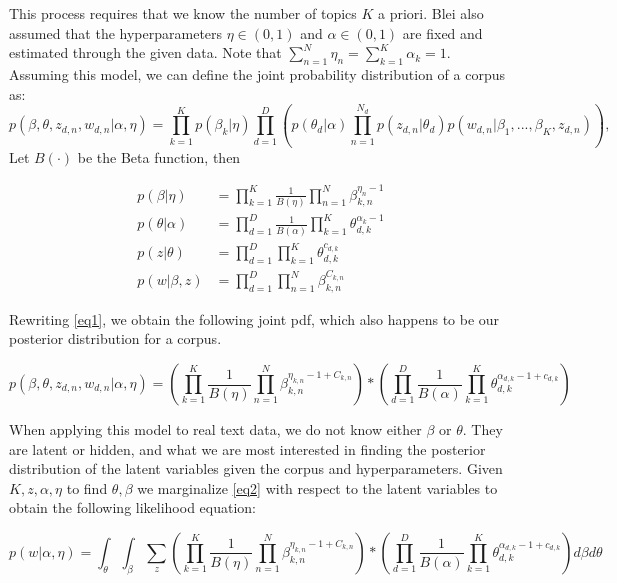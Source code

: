 \documentclass[3p,times]{elsarticle}
\begin{document}
This process requires that we know the number of topics $K$ a priori. Blei also assumed that the hyperparameters $\eta \in  (0,1)$ and $\alpha \in (0,1)$ are fixed and estimated through the given data. Note that $\sum_{n=1}^{N}{\eta_{n}}=\sum_{k=1}^{K}{\alpha_{k}}=1$. Assuming this model, we can define the joint probability distribution of a corpus as:
\begin{equation} \label{eq1}
p(\beta,\theta,z_{d,n},w_{d,n} | \alpha,\eta) = \prod_{k=1}^{K}{p(\beta_{k} | \eta)}  \prod_{d=1}^{D}\left( p(\theta_{d} | \alpha) \prod_{n=1}^{N_{d}}{p(z_{d,n} | \theta_{d})}p(w_{d,n} | \beta_{1},...,\beta_{K},z_{d,n}) \right)  ,
\end{equation}
Let $B(\cdot)$ be the Beta function, then

\begin{equation}
\begin{split}
p(\beta | \eta) &=\prod_{k=1}^{K}{\frac{1}{B(\eta)}\prod_{n=1}^{N}{\beta_{k,n}^{\eta_{n}-1}}} \\
p(\theta | \alpha) &=\prod_{d=1}^{D}{\frac{1}{B(\alpha)}\prod_{k=1}^{K}{\theta_{d,k}^{\alpha_{k}-1}}} \\
p(z | \theta) &=\prod_{d=1}^{D}{\prod_{k=1}^{K}{\theta_{d,k}^{c_{d,k}}}} \\
p(w | \beta,z) &=\prod_{d=1}^{D}{\prod_{n=1}^{N}{\beta_{k,n}^{C_{k,n}}}}
\end{split}
\end{equation}

Rewriting \ref{eq1}, we obtain the following joint pdf, which also happens to be our posterior distribution for a corpus.

\begin{equation} \label{eq2}
p(\beta,\theta,z_{d,n},w_{d,n} | \alpha,\eta)=\left( \prod_{k=1}^{K}{\frac{1}{B(\eta)}\prod_{n=1}^{N}{\beta_{k,n}^{\eta_{k,n}-1+C_{k,n}} } }    \right) * \left( \prod_{d=1}^{D}{\frac{1}{B(\alpha)}\prod_{k=1}^{K}{\theta_{d,k}^{\alpha_{d,k}-1+c_{d,k}} } }    \right)
\end{equation}

When applying this model to real text data, we do not know either $\beta$ or $\theta$. They are latent or hidden, and what we are most interested in finding the posterior distribution of the latent variables given the corpus and hyperparameters. Given $K,z,\alpha,\eta$ to find $\theta, \beta$ we marginalize \ref{eq2} with respect to the latent variables to obtain the following likelihood equation:

\begin{equation} \label{eq3}
p(w | \alpha,\eta)=\int_{\theta} \int_{\beta} \sum_{z} \left( \prod_{k=1}^{K}{\frac{1}{B(\eta)}\prod_{n=1}^{N}{\beta_{k,n}^{\eta_{k,n}-1+C_{k,n}} } }    \right) * \left( \prod_{d=1}^{D}{\frac{1}{B(\alpha)}\prod_{k=1}^{K}{\theta_{d,k}^{\alpha_{d,k}-1+c_{d,k}} } }    \right) d\beta d\theta
\end{equation}
\end{document}
